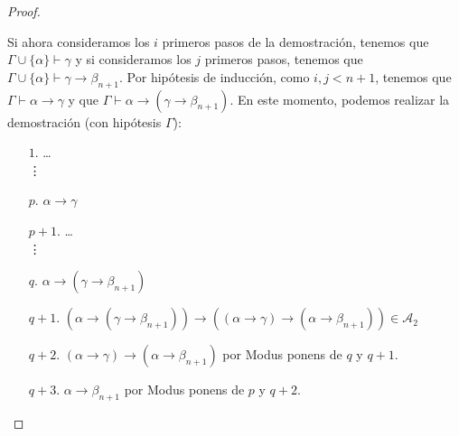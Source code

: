 \begin{teo}
\begin{proof}
\begin{description}
\begin{itemize}
                        Si ahora consideramos los $i$ primeros pasos de la demostración, tenemos que $\Gamma\cup\{\alpha\}\vdash \gamma$ y si consideramos los $j$ primeros pasos, tenemos que $\Gamma\cup\{\alpha\}\vdash \gamma\to\beta_{n+1}$. Por hipótesis de inducción, como $i,j<n+1$, tenemos que $\Gamma\vdash \alpha\to\gamma$ y que $\Gamma\vdash \alpha\to(\gamma\to\beta_{n+1})$. En este momento, podemos realizar la demostración (con hipótesis $\Gamma$):
                        \begin{enumerate}
                            \item[$1$.] \ldots \\
                                \vdots
                            \item[$p$.] $\alpha\to\gamma$
                            \item[$p+1$.] \ldots \\
                                \vdots
                            \item[$q$.] $\alpha\to(\gamma\to\beta_{n+1})$
                            \item[$q+1$.] $(\alpha\to(\gamma\to\beta_{n+1}))\to((\alpha\to\gamma)\to(\alpha\to\beta_{n+1}))\in \mathcal{A}_2$
                            \item[$q+2$.] $(\alpha\to\gamma)\to(\alpha\to\beta_{n+1})$ por Modus ponens de $q$ y $q+1$.
                            \item[$q+3$.] $\alpha\to\beta_{n+1}$ por Modus ponens de $p$ y $q+2$.
                        \end{enumerate}
                \end{itemize}
        \end{description}
    \end{proof}
\end{teo}

